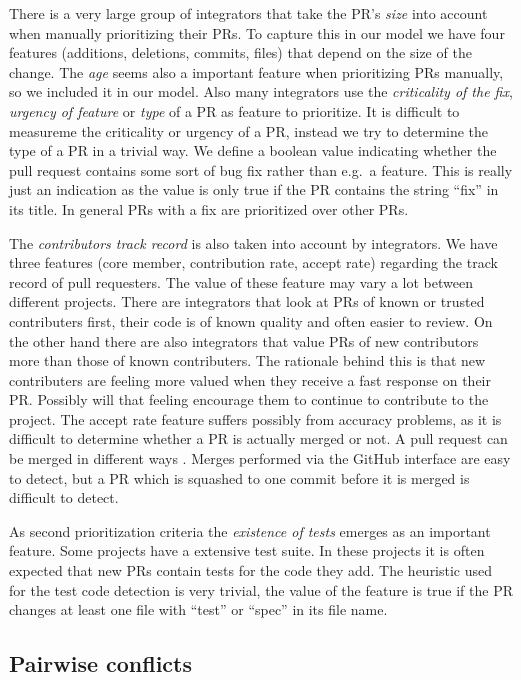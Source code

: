 There is a very large group of integrators that take the PR's \emph{size} into account when manually prioritizing their PRs.
To capture this in our model we have four features (additions, deletions, commits, files) that depend on the size of the change.
The \emph{age} seems also a important feature when prioritizing PRs manually, so we included it in our model.
Also many integrators use the \emph{criticality of the fix}, \emph{urgency of feature} or \emph{type} of a PR as feature to prioritize.
It is difficult to measureme the criticality or urgency of a PR, instead we try to determine the type of a PR in a trivial way.
We define a boolean value indicating whether the pull request contains some sort of bug fix rather than e.g.\ a feature.
This is really just an indication as the value is only true if the PR contains the string ``fix'' in its title.
In general PRs with a fix are prioritized over other PRs.

The \emph{contributors track record} is also taken into account by integrators.
We have three features (core member, contribution rate, accept rate) regarding the track record of pull requesters.
The value of these feature may vary a lot between different projects.
There are integrators that look at PRs of known or trusted contributers first, their code is of known quality and often easier to review.
On the other hand there are also integrators that value PRs of new contributors more than those of known contributers.
The rationale behind this is that new contributers are feeling more valued when they receive a fast response on their PR.
Possibly will that feeling encourage them to continue to contribute to the project.
The accept rate feature suffers possibly from accuracy problems, as it is difficult to determine whether a PR is actually merged or not.
A pull request can be merged in different ways \cite{GPD14}.
Merges performed via the GitHub interface are easy to detect, but a PR which is squashed to one commit before it is merged is difficult to detect.

As second prioritization criteria the \emph{existence of tests} emerges as an important feature.
Some projects have a extensive test suite.
In these projects it is often expected that new PRs contain tests for the code they add.
The heuristic used for the test code detection is very trivial, the value of the feature is true if the PR changes at least one file with ``test'' or ``spec'' in its file name.

\subsection{Pairwise conflicts}
\label{sec:pairwise}

